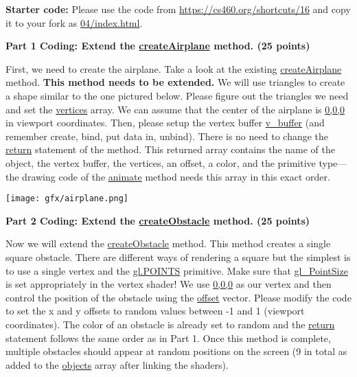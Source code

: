 \documentclass[10pt,oneside,onecolumn,letterpaper]{article}
\begin{document}
\vspace{.5cm}

\noindent\textbf{Starter code:} Please use the code from \url{https://cs460.org/shortcuts/16} and copy it to your fork as \url{04/index.html}.

\vspace{.5cm}

\noindent\textbf{Part 1 Coding: Extend the \url{createAirplane} method. (25 points)}

\vspace{.5cm}

First, we need to create the airplane. Take a look at the existing \url{createAirplane} method. \textbf{This method needs to be extended.} We will use triangles to create a shape similar to the one pictured below. Please figure out the triangles we need and set the \url{vertices} array. We can assume that the center of the airplane is \url{0,0,0} in viewport coordinates. Then, please setup the vertex buffer \url{v_buffer} (and remember create, bind, put data in, unbind). There is no need to change the \url{return} statement of the method. This returned array contains the name of the object, the vertex buffer, the vertices, an offset, a color, and the primitive type---the drawing code of the \url{animate} method needs this array in this exact order.

\begin{center}
\texttt{[image: gfx/airplane.png]}
\end{center}

\vspace{.5cm}

\noindent\textbf{Part 2 Coding: Extend the \url{createObstacle} method. (25 points)}

\vspace{.5cm}

Now we will extend the \url{createObstacle} method. This method creates a single square obstacle. There are different ways of rendering a square but the simplest is to use a single vertex and the \url{gl.POINTS} primitive. Make sure that \url{gl_PointSize} is set appropriately in the vertex shader! We use \url{0,0,0} as our vertex and then control the position of the obstacle using the \url{offset} vector. Please modify the code to set the x and y offsets to random values between -1 and 1 (viewport coordinates). The color of an obstacle is already set to random and the \url{return} statement follows the same order as in Part 1. Once this method is complete, multiple obstacles should appear at random positions on the screen (9 in total as added to the \url{objects} array after linking the shaders).
\end{document}
